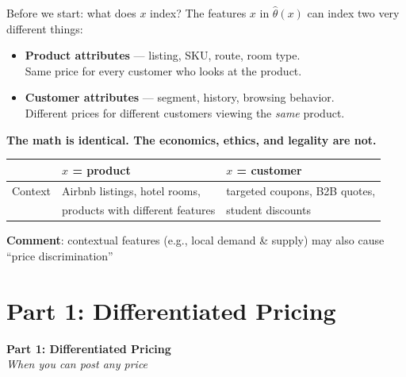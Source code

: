 \documentclass[aspectratio=169, 11pt, handout]{beamer}
\begin{document}
\begin{frame}{Before we start: what does $x$ index?}
The features $x$ in $\hat\theta(x)$ can index two very different things:
\vspace{0.4em}

\begin{itemize}
    \item \textcolor{sbgreen}{\textbf{Product attributes}} --- listing, SKU, route, room type. \\
          Same price for every customer who looks at the product.
    \item \textcolor{warnred}{\textbf{Customer attributes}} --- segment, history, browsing behavior. \\
          Different prices for different customers viewing the \emph{same} product.
\end{itemize}
\vspace{0.6em}

\textbf{The math is identical. The economics, ethics, and legality are not.}
\vspace{0.4em}

\begin{center}
\begin{tabular}{lll}
\toprule
 & \textbf{$x$ = product} & \textbf{$x$ = customer} \\
\midrule
Context & Airbnb listings, hotel rooms,    & targeted coupons, B2B quotes,\\
        & products with different features & student discounts\\
\bottomrule
\end{tabular}
\end{center}

\textbf{Comment}: contextual features (e.g., local demand \& supply) may also cause ``price discrimination'' 

\end{frame}




\section{Part 1: Differentiated Pricing}

\begin{frame}
    \centering
    \vfill
    {\LARGE \textcolor{sbgreen}{\textbf{Part 1: Differentiated Pricing}}}\\[0.8em]
    {\small \itshape When you can post any price}\\[0.4em]
    \vfill
\end{frame}
\end{document}
